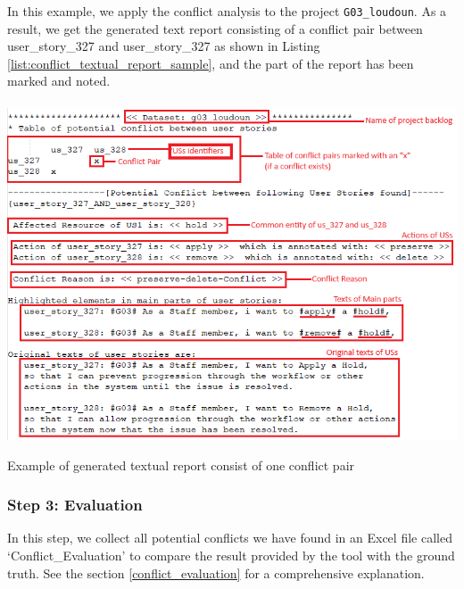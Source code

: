 \begin{example}
In this example, we apply the conflict analysis to the project \texttt{G03\_loudoun}. As a result, we get the generated text report consisting of a conflict pair between user\_story\_327 and user\_story\_327 as shown in Listing \ref{list:conflict_textual_report_sample}, and the part of the report has been marked and noted.
\begin{MyListing}
	\paragraph{}
	\centering
	\includegraphics[scale=0.7]{Listing/conflict_textual_report_sample.png}
	\caption{Example of generated textual report consist of one conflict pair}\label{list:conflict_textual_report_sample}
\end{MyListing}
\end{example}
\subsubsection*{Step 3: Evaluation}
In this step, we collect all potential conflicts we have found in an Excel file called ‘Conflict\_Evaluation’ to compare the result provided by the tool with the ground truth. See the section \ref{conflict_evaluation} for a comprehensive explanation.



